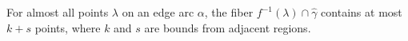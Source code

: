 
For almost all points $\lambda$ on an edge arc $\alpha$, the fiber $f^{-1}(\lambda) \cap \hat{\gamma}$ contains at most $k+s$ points, where $k$ and $s$ are bounds from adjacent regions.
